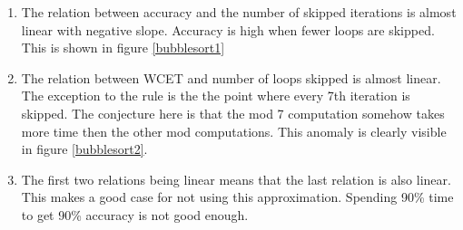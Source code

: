 \begin{enumerate}
\item The relation between accuracy and the number of skipped iterations is almost linear with negative slope. Accuracy is high when fewer loops are skipped. This is shown in figure \ref{bubblesort1} 
\item The relation between WCET and number of loops skipped is almost linear. The exception to the rule is the the point where every 7th iteration is skipped. The conjecture here is that the mod 7 computation somehow takes more time then the other mod computations. This anomaly is clearly visible in figure \ref{bubblesort2}.
  \item The first two relations being linear means that the last relation is also linear. This makes a good case for not using this approximation. Spending 90\% time to get 90\% accuracy is not good enough.
\end{enumerate}





